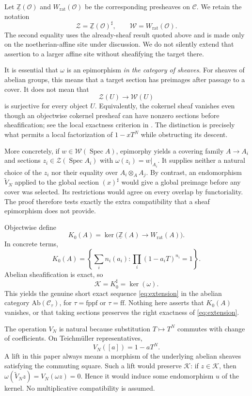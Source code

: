 \documentclass[11pt]{article}
\theoremstyle{definition}
\newcommand{\Spec}{\operatorname{Spec}}
\newcommand{\Wrat}{W_{\mathrm{rat}}}
\newcommand{\Zpre}{\underline{\mathbb Z}}
\newcommand{\Zsh}{\mathcal Z}
\newcommand{\Wsh}{\mathcal W}
\newcommand{\Ksh}{\mathcal K}
\newcommand{\sh}{\sharp}
\newcommand{\ff}{\mathrm{ff}}
\newcommand{\fppf}{\mathrm{fppf}}
\begin{document}
Let \(\Zpre(\mathcal O)\) and \(\Wrat(\mathcal O)\) be the corresponding
presheaves on \(\mathscr C\).  We retain the notation
\[
 \Zsh=\Zpre(\mathcal O)^\sh,\qquad
 \Wsh=\Wrat(\mathcal O).
\]
The second equality uses the already-sheaf result quoted above and is made
only on the noetherian-affine site under discussion.  We do not silently
extend that assertion to a larger affine site without sheafifying the
target there.

It is essential that \(\omega\) is an epimorphism \emph{in the category of
sheaves}.  For sheaves of abelian groups, this means that a target section
has preimages after passage to a cover.  It does not mean that
\[
 \Zsh(U)\longrightarrow\Wsh(U)
\]
is surjective for every object \(U\).  Equivalently, the cokernel sheaf
vanishes even though an objectwise cokernel presheaf can have nonzero
sections before sheafification; see the local exactness criterion in
\cite[Tag 03CN]{StacksProject}.  The distinction is precisely what permits
a local factorization of \(1-xT^N\) while obstructing its descent.

More concretely, if \(w\in\Wsh(\Spec A)\), epimorphy yields a covering
family \(A\to A_i\) and sections \(z_i\in\Zsh(\Spec A_i)\) with
\(\omega(z_i)=w|_{A_i}\).  It supplies neither a natural choice of the
\(z_i\) nor their equality over \(A_i\otimes_A A_j\).  By contrast, an
endomorphism \(\widetilde V_N\) applied to the global section
\((x)^\sh\) would give a global preimage before any cover was selected.
Its restrictions would agree on every overlap by functoriality.  The proof
therefore tests exactly the extra compatibility that a sheaf epimorphism
does not provide.

Objectwise define
\[
 K_0(A)=\ker\bigl(\Zpre(A)\longrightarrow\Wrat(A)\bigr).
\]
In concrete terms,
\[
 K_0(A)=
 \left\{\sum_i n_i(a_i):
   \prod_i(1-a_iT)^{n_i}=1\right\}.
 \tag{2.2}\label{eq:kernel}
\]
Abelian sheafification is exact, so
\[
 \Ksh=K_0^\sh=\ker(\omega).
\]
This yields the genuine short exact sequence \eqref{eq:extension} in the
abelian category \(\mathrm{Ab}(\mathscr C_\tau)\), for
\(\tau=\fppf\) or \(\tau=\ff\).  Nothing here asserts that
\(K_0(A)\) vanishes, or that taking sections preserves the right exactness
of \eqref{eq:extension}.

The operation \(V_N\) is natural because substitution \(T\mapsto T^N\)
commutes with change of coefficients.  On Teichm\"uller representatives,
\[
 V_N([a])=1-aT^N.
 \tag{2.3}\label{eq:versch}
\]
A lift in this paper always means a morphism of the underlying abelian
sheaves satisfying the commuting square.  Such a lift would preserve
\(\Ksh\): if \(z\in\Ksh\), then
\(\omega(\widetilde V_Nz)=V_N(\omega z)=0\).  Hence it would induce some
endomorphism \(u\) of the kernel.  No multiplicative compatibility is
assumed.
\end{document}
